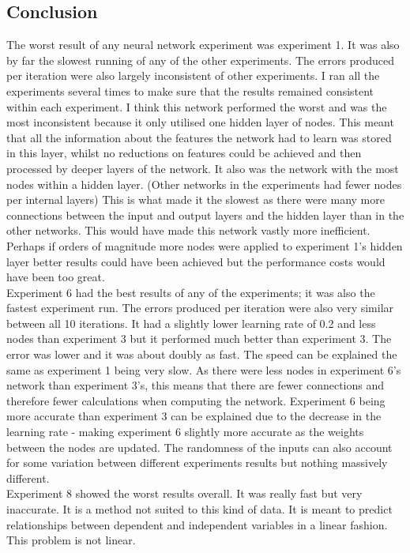 \documentclass[11pt]{article}
\begin{document}
\begin{page}
\section{Conclusion}
The worst result of any neural network experiment was experiment 1. It was also by far the slowest running of any of the other experiments. The errors produced per iteration were also largely inconsistent of other experiments. I ran all the experiments several times to make sure that the results remained consistent within each experiment. I think this network performed the worst and was the most inconsistent because it only utilised one hidden layer of nodes. This meant that all the information about the features the network had to learn was stored in this layer, whilst no reductions on features could be achieved and then processed by deeper layers of the network. It also was the network with the most nodes within a hidden layer. (Other networks in the experiments had fewer nodes per internal layers) This is what made it the slowest as there were many more connections between the input and output layers and the hidden layer than in the other networks. This would have made this network vastly more inefficient. Perhaps if orders of magnitude more nodes were applied to experiment 1's hidden layer better results could have been achieved but the performance costs would have been too great. \\

\noindent Experiment 6 had the best results of any of the experiments; it was also the fastest experiment run. The errors produced per iteration were also very similar between all 10 iterations. It had a slightly lower learning rate of 0.2 and less nodes than experiment 3 but it performed much better than experiment 3. The error was lower and it was about doubly as fast. The speed can be explained the same as experiment 1 being very slow. As there were less nodes in experiment 6’s network than experiment 3’s, this means that there are fewer connections and therefore fewer calculations when computing the network. Experiment 6 being more accurate than experiment 3 can be explained due to the decrease in the learning rate - making experiment 6 slightly more accurate as the weights between the nodes are updated. The randomness of the inputs can also account for some variation between different experiments results but nothing massively different.\\

\noindent Experiment 8 showed the worst results overall. It was really fast but very inaccurate. It is a method not suited to this kind of data. It is meant to predict relationships between dependent and independent variables in a linear fashion. This problem is not linear.


\end{page}
\end{document}
